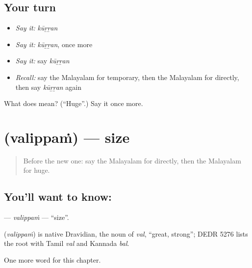 \subsection*{Your turn}
\begin{itemize}
\raggedright
  \item \emph{Say it:} \emph{kūṟṟan}
  \item \emph{Say it:} \emph{kūṟṟan}, once more
  \item \emph{Say it:} say \emph{kūṟṟan}
  \item \emph{Recall:} say the Malayalam for temporary, then the Malayalam for directly, then say \emph{kūṟṟan} again
\end{itemize}

\begin{tcolorbox}[breakable,colback=teal!4,colframe=teal!35!black,title={Before you move on}]
What does  mean? (\textquotedblleft{}Huge\textquotedblright{}.) Say it once more.
\end{tcolorbox}
\section[\texorpdfstring{\ml{വലിപ്പം} (valippaṁ)}{വലിപ്പം (valippaṁ)}]{ (valippaṁ) — size}

\label{lesson:ML-C284-valippam}



\begin{quote}
Before the new one: say the Malayalam for directly, then the Malayalam for huge.
\end{quote}

\subsection*{You'll want to know: }
\textbf{} — \emph{valippaṁ} — \textquotedblleft{}size\textquotedblright{}.

\begin{cousinweb}
\textbf{} (\emph{valippaṁ}) is native Dravidian, the noun of \emph{val}, \textquotedblleft{}great, strong\textquotedblright{}; DEDR 5276 lists the root with Tamil \emph{val} and Kannada \emph{bal}.
\end{cousinweb}

\begin{grammarlens}[title={What you've built}]
One more word for this chapter.
\end{grammarlens}

